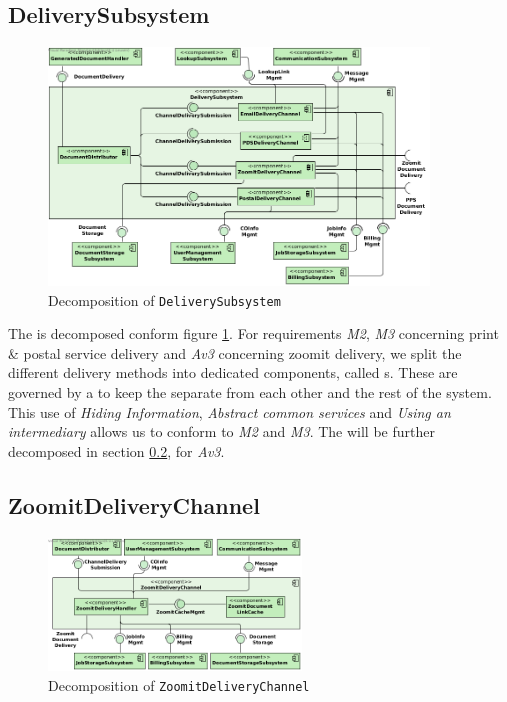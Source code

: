 \subsection{DeliverySubsystem}
\begin{figure}[!htp]
    \centering
    \includegraphics[width=0.9\textwidth]{figures/Delivery Subsystem.png}
    \caption{Decomposition of \texttt{DeliverySubsystem}}\label{fig:decomp-delisub}
\end{figure}

The  is decomposed conform figure \ref{fig:decomp-delisub}. For requirements \emph{M2}, \emph{M3} concerning print \& postal service delivery and \emph{Av3} concerning zoomit delivery, we split the different delivery methods into dedicated components, called s. These are governed by a  to keep the  separate from each other and the rest of the system. This use of \emph{Hiding Information}, \emph{Abstract common services} and \emph{Using an intermediary} allows us to conform to \emph{M2} and \emph{M3}. The  will be further decomposed in section \ref{sec:decomp-zoomitchan}, for \emph{Av3}.

\subsection{ZoomitDeliveryChannel}\label{sec:decomp-zoomitchan}
\begin{figure}[!htp]
    \centering
    \includegraphics[width=0.6\textwidth]{figures/ZoomitDeliveryChannel.png}
    \caption{Decomposition of \texttt{ZoomitDeliveryChannel}}\label{fig:decomp-zoomitchan}
\end{figure}

